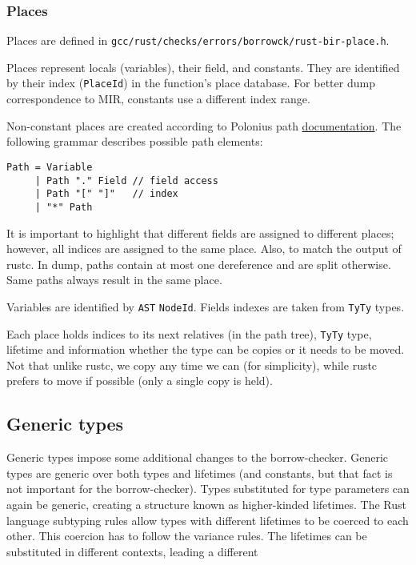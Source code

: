 \hypertarget{places}{%
\subsubsection{Places}\label{places}}

Places are defined in
\texttt{gcc/rust/checks/errors/borrowck/rust-bir-place.h}.

Places represent locals (variables), their field, and constants. They
are identified by their index (\texttt{PlaceId}) in the function's place
database. For better dump correspondence to MIR, constants use a
different index range.

Non-constant places are created according to Polonius path
\href{https://rust-lang.github.io/polonius/rules/atoms.html}{documentation}.
The following grammar describes possible path elements:

\begin{verbatim}
Path = Variable
     | Path "." Field // field access
     | Path "[" "]"   // index
     | "*" Path
\end{verbatim}

It is important to highlight that different fields are assigned to
different places; however, all indices are assigned to the same place.
Also, to match the output of rustc. In dump, paths contain at most one
dereference and are split otherwise. Same paths always result in the
same place.

Variables are identified by \texttt{AST} \texttt{NodeId}. Fields indexes
are taken from \texttt{TyTy} types.

Each place holds indices to its next relatives (in the path tree),
\texttt{TyTy} type, lifetime and information whether the type can be
copies or it needs to be moved. Not that unlike rustc, we copy any time
we can (for simplicity), while rustc prefers to move if possible (only a
single copy is held).

\hypertarget{generic-types}{%
\subsection{Generic types}\label{generic-types}}

Generic types impose some additional changes to the borrow-checker.
Generic types are generic over both types and lifetimes (and constants,
but that fact is not important for the borrow-checker). Types
substituted for type parameters can again be generic, creating a
structure known as higher-kinded lifetimes. The Rust language subtyping
rules allow types with different lifetimes to be coerced to each other.
This coercion has to follow the variance rules. The lifetimes can be
substituted in different contexts, leading a different

